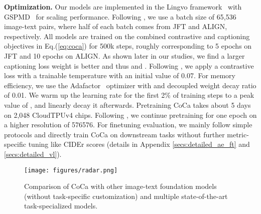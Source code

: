 \textbf{Optimization.} Our models are implemented in the Lingvo framework~\citep{shen2019lingvo} with GSPMD~\citep{huang2019gpipe, xu2020automatic, lepikhin2020gshard, xu2021gspmd} for scaling performance. 
Following \citep{pham2021combined},
we use a batch size of 65,536 image-text pairs, where half of each batch comes from JFT and ALIGN, respectively.
All models are trained on the combined contrastive and captioning objectives in Eq.(\ref{eq:coca}) for 500k steps, roughly corresponding to 5 epochs on JFT and 10 epochs on ALIGN.
As shown later in our studies, we find a larger captioning loss weight is better and thus  and .
Following \citep{jia2021scaling},
we apply a contrastive loss with a trainable temperature  with an initial value of 0.07.
For memory efficiency,
we use the Adafactor~\cite{shazeer2018adafactor} optimizer with  and decoupled weight decay ratio of 0.01.
We warm up the learning rate for the first 2\% of training steps to a peak value of , and linearly decay it afterwards. Pretraining CoCa takes about 5 days on 2,048 CloudTPUv4 chips.
Following \cite{radford2021learning, jia2021scaling, yuan2021florence},
we continue pretraining for one epoch on a higher resolution of 576576.
For finetuning evaluation,
we mainly follow simple protocols and directly train CoCa on downstream tasks without further metric-specific tuning like CIDEr scores (details in Appendix \ref{secs:detailed_ae_ft} and \ref{secs:detailed_vl}).

\begin{figure}[t]
\centering
\texttt{[image: figures/radar.png]}
\caption{Comparison of CoCa with other image-text foundation models (without task-specific customization) and multiple state-of-the-art task-specialized models.}
\label{figs:key_results}
\end{figure}

